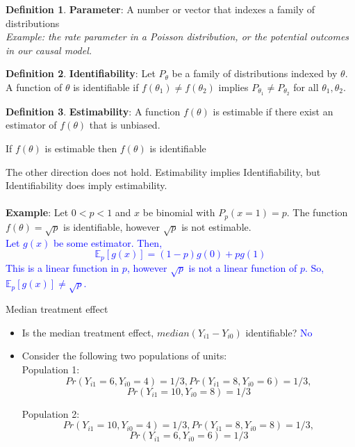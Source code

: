 \documentclass[handout]{beamer}
\theoremstyle{definition}
\newtheorem{defn}{Definition}[section]
\begin{document}
\begin{frame}
\begin{defn}
\textbf{Parameter}: A number or vector that indexes a family of distributions\\
\emph{Example: the rate parameter in a Poisson distribution, or the potential outcomes in our causal model.}  
\end{defn}
\pause
\begin{defn}
\textbf{Identifiability}: Let $P_\theta$ be a family of distributions indexed by $\theta$. A function of $\theta$ is identifiable if $f(\theta_1) \neq f(\theta_2)$ implies $P_{\theta_1} \neq P_{\theta_2}$ for all $\theta_1, \theta_2$.  
\end{defn}
\pause
\begin{defn}
\textbf{Estimability}: A function $f(\theta)$ is estimable if there exist an estimator of $f(\theta)$ that is unbiased.
\end{defn}
\end{frame}


\begin{frame}
\begin{theorem}
If $f(\theta)$ is estimable then $f(\theta)$ is identifiable
\end{theorem}
\pause
The other direction does not hold. Estimability implies Identifiability, but Identifiability does imply estimability.  \\~\\
\pause
\textbf{Example}: Let $0<p<1$ and $x$ be binomial with $P_p(x=1)=p$. The function $f(\theta) = \sqrt{p}$ is identifiable, however $\sqrt{p}$ is not estimable.\\
\pause
\textcolor{blue}{Let $g(x)$ be some estimator. Then, 
$$\mathbb{E}_p \left[g(x) \right] = (1-p)g(0)+pg(1)$$
This is a linear function in $p$, however $\sqrt{p}$ is not a linear function of $p$. So, 
$\mathbb{E}_p \left[g(x) \right] \neq \sqrt{p}$.}  
\end{frame}



\begin{frame}{Median treatment effect}
\begin{itemize}
\item Is the median treatment effect, $median(Y_{i1}-Y_{i0})$ identifiable? \pause
\textcolor{blue}{No} \pause
\item Consider the following two populations of units:\\
Population 1:
$$Pr(Y_{i1}=6,Y_{i0}=4)=1/3,Pr(Y_{i1}=8,Y_{i0}=6)=1/3,$$
$$Pr(Y_{i1}=10,Y_{i0}=8)=1/3 $$

Population 2:
$$Pr(Y_{i1}=10,Y_{i0}=4)=1/3,Pr(Y_{i1}=8,Y_{i0}=8)=1/3,$$
$$Pr(Y_{i1}=6,Y_{i0}=6)=1/3 $$
\end{itemize}
\end{frame}
\end{document}
